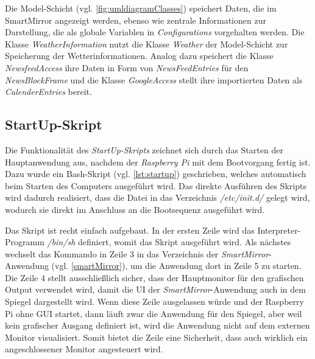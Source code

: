  Die Model-Schicht (vgl. \autoref{fig:umldiagramClasses}) speichert Daten, die im SmartMirror angezeigt werden, ebenso wie zentrale Informationen zur Darstellung, die als globale Variablen in \textit{Configurations} vorgehalten werden. Die Klasse \textit{WeatherInformation} nutzt die Klasse \textit{Weather} der Model-Schicht zur Speicherung der Wetterinformationen. 
 Analog dazu speichert die Klasse \textit{NewsfeedAccess} ihre Daten in Form von \textit{NewsFeedEntries} für den \textit{NewsBlockFrame} und die Klasse \textit{GoogleAccess} stellt ihre importierten Daten  als \textit{CalenderEntries} bereit.
 

\subsection{StartUp-Skript}
\label{subsec:startup}
Die Funktionalität des \textit{StartUp-Skripts} zeichnet sich durch das Starten der Hauptanwendung aus, nachdem der \textit{Raspberry Pi} mit dem Bootvorgang fertig ist. Dazu wurde ein Bash-Skript (vgl. \autoref{lst:startup}) geschrieben, welches automatisch beim Starten des Computers ausgeführt wird. 
Das direkte Ausführen des Skripts wird dadurch realisiert, dass die Datei in das Verzeichnis \textit{/etc/init.d/} gelegt wird, wodurch sie direkt im Anschluss an die Bootsequenz ausgeführt wird. \cite{nemeth2006linux}

\begin{minipage}{\textwidth}
	
\end{minipage} 

Das Skript ist recht einfach aufgebaut. In der ersten Zeile wird das Interpreter-Programm \textit{/bin/sh} definiert, womit das Skript ausgeführt wird. Als nächstes wechselt das Kommando in Zeile 3 in das Verzeichnis der \textit{SmartMirror}-Anwendung (vgl. \autoref{smartMirror}), um die Anwendung dort in Zeile 5 zu starten. Die Zeile 4 stellt ausschließlich sicher, dass der Hauptmonitor für den grafischen Output verwendet wird, damit die UI der \textit{SmartMirror}-Anwendung auch in dem Spiegel dargestellt wird. Wenn diese Zeile ausgelassen würde und der Raspberry Pi ohne GUI startet, dann läuft zwar die Anwendung für den Spiegel, aber weil kein grafischer Ausgang definiert ist, wird die Anwendung nicht auf dem externen Monitor visualisiert. Somit bietet die Zeile eine Sicherheit, dass auch wirklich ein angeschlossener Monitor angesteuert wird.

